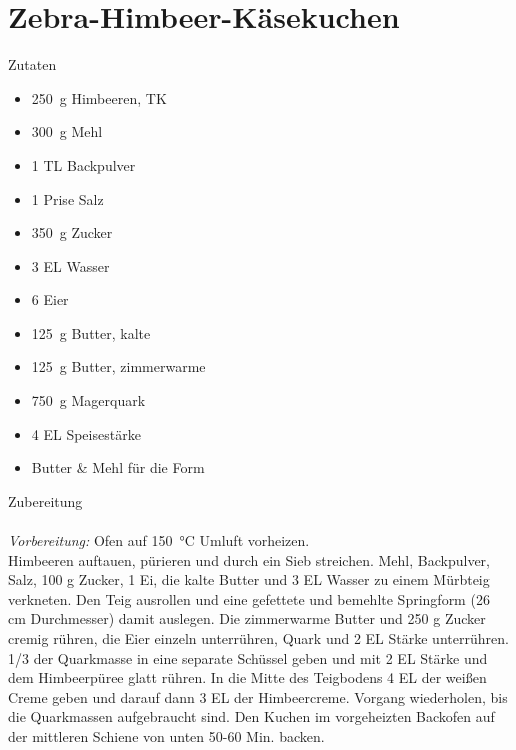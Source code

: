 \section*{Zebra-Himbeer-Käsekuchen}
\ihead{}\ohead{}
\cfoot{}
{\Large Zutaten}
\begin{multicols}{2}
\begin{itemize}
    \item \SI{250}{g} Himbeeren, TK
    \item \SI{300}{g} Mehl
    \item \num{1} TL Backpulver
    \item \num{1} Prise Salz
    \item \SI{350}{g} Zucker
    \item \num{3} EL Wasser
    \item \num{6} Eier
    \item \SI{125}{g} Butter, kalte
    \item \SI{125}{g} Butter, zimmerwarme
    \item \SI{750}{g} Magerquark
    \item \num{4} EL Speisestärke
    \item Butter \& Mehl für die Form
\end{itemize}
\end{multicols}
\noindent
{\Large Zubereitung}\\
\\
\textit{Vorbereitung:} Ofen auf \SI{150}{\celsius} Umluft vorheizen.\\
Himbeeren auftauen, pürieren und durch ein Sieb streichen.
Mehl, Backpulver, Salz, 100 g Zucker, 1 Ei, die kalte Butter und 3 EL Wasser zu einem Mürbteig verkneten.
Den Teig ausrollen und eine gefettete und bemehlte Springform (26 cm Durchmesser) damit auslegen.
Die zimmerwarme Butter und 250 g Zucker cremig rühren, die Eier einzeln unterrühren, Quark und 2 EL Stärke unterrühren.
1/3 der Quarkmasse in eine separate Schüssel geben und mit 2 EL Stärke und dem Himbeerpüree glatt rühren.
In die Mitte des Teigbodens 4 EL der weißen Creme geben und darauf dann 3 EL der Himbeercreme.
Vorgang wiederholen, bis die Quarkmassen aufgebraucht sind.
Den Kuchen im vorgeheizten Backofen auf der mittleren Schiene von unten 50-60 Min. backen.
